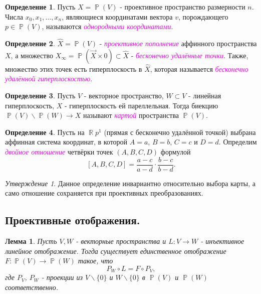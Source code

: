 \documentclass[a4paper,100pt]{article}
\theoremstyle{indented}
\newtheorem{lemma}{Лемма}
\theoremstyle{definition}
\newtheorem{defn}{Определение}
\theoremstyle{remark}
\newtheorem{stat}{Утверждение}
\DeclareMathOperator{\ra}{\rightarrow}
\DeclareMathOperator{\RR}{\mathbb{R}}
\DeclareMathOperator{\PP}{\mathbb{P}}
\begin{document}
\begin{defn}
    Пусть $X=\PP(V)$ - проективное пространство размерности $n$. Числа $x_0, x_1, \ldots, x_n$, являющиеся координатами вектора $v$, порождающего $p\in \PP(V)$, называются \textit{\textcolor{magenta}{\hypertarget{s36}{однородными координатами}}}.
\end{defn}

\begin{defn}
    $\hat{X}=\PP(V)$ - \textit{\textcolor{magenta}{\hypertarget{s37}{проективное пополнение}}} аффинного пространства $X$, а множество $X_\infty = \PP(\vec{X}\times 0)\subset \hat{X}$ - \textit{\textcolor{magenta}{\hypertarget{s38}{бесконечно удалённые точки}}}. Также, множество этих точек есть гиперплоскость в $\hat{X}$, которая называется \textit{\textcolor{magenta}{\hypertarget{s39}{бесконечно удалённой гиперплоскостью}}}.
\end{defn}

\begin{defn}
    Пусть $V$ - векторное пространство, $W\subset V$ - линейная гиперплоскость, $X$ - гиперплоскость ей пареллельная. Тогда биекцию $\PP(V) \backslash \PP(W) \ra X$ называют \textit{\textcolor{magenta}{\hypertarget{s40}{картой}}} пространства $\PP(V)$.
\end{defn}

\begin{defn}
    Пусть на $\RR p^1$ (прямая с бесконечно удалённой точкой) выбрана аффинная система координат, в которой $A=a$, $B=b$, $C=c$ и $D=d$. Определим \textit{\textcolor{magenta}{\hypertarget{s41}{двойное отношение}}} четвёрки точек $(A, B, C, D)$ формулой
    \[
        [A, B, C, D]=\frac{a-c}{a-d}\cdot \frac{b-c}{b-d}.
    \]
\end{defn}

\begin{stat}
    Данное определение инвариантно относительно выбора карты, а само отношение сохраняется при проективных преобразованиях.
\end{stat}

\subsection{Проективные отображения.}

\begin{lemma}
    Пусть $V, W$ - векторные пространства и $L:V\ra W$ - инъективное линейное отображение. Тогда существует единственное отображение $F:\PP(V) \ra \PP(W)$ такое, что 
    \[
        P_W\circ L = F \circ P_V, 
    \]
    где $P_V$, $P_W$ - проекции из $V \backslash \{0\}$ и $W \backslash \{0\}$ в $\PP(V)$ и $\PP(W)$ соответственно.
\end{lemma}
\end{document}
